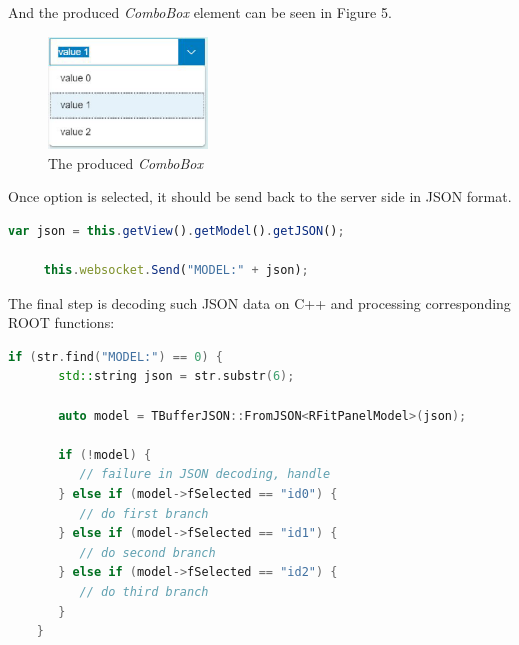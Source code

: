 \documentclass[a4paper]{jpconf}
\begin{document}
And the produced \textit{ComboBox} element can be seen in Figure 5.

\begin{figure}[h]
  \begin{center}
    \includegraphics[width=10pc]{testCombo.eps}\hspace{2pc}%
  \end{center}
  \centering
\begin{minipage}[b]{20pc}\caption{\label{label}The produced \textit{ComboBox}}
\end{minipage}
\end{figure}

Once option is selected, it should be send back to the server side in JSON format.

\begin{lstlisting}[language=JavaScript,numbers=none]
     var json = this.getView().getModel().getJSON();

     this.websocket.Send("MODEL:" + json);
\end{lstlisting}

The final step is decoding such JSON data on C++ and processing corresponding ROOT functions:

\begin{lstlisting}[language=C++,numbers=none]
    if (str.find("MODEL:") == 0) {
       std::string json = str.substr(6);

       auto model = TBufferJSON::FromJSON<RFitPanelModel>(json);

       if (!model) {
          // failure in JSON decoding, handle
       } else if (model->fSelected == "id0") {
          // do first branch
       } else if (model->fSelected == "id1") {
          // do second branch
       } else if (model->fSelected == "id2") {
          // do third branch
       }
    }
\end{lstlisting}
\end{document}
